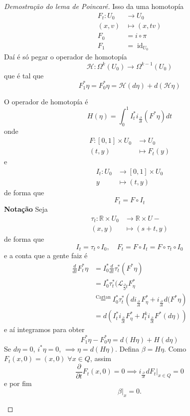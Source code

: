 \begin{itemize}
\begin{proof}[Demostra\c c\~ao do lema de Poincar\'e]
			Isso da uma homotop\'ia
			\begin{align*}
				F_t: U_0 &\longrightarrow U_0 \\
				(x,v) &\longmapsto (x,tv)\\
				F_0&=i\circ \pi\\
				F_1&=\operatorname{id}_{U_0}
			\end{align*}
			Da\'i \'e s\'o pegar o operador de homotop\'ia
			\[\mathcal{H}:\Omega^{k}(U_0)\to \Omega^{k-1}(U_0)\]
			que \'e tal que
			\[F_1^*\eta=F_0^* \eta=\mathcal{H}(d\eta)+d(\mathcal{H}\eta)\]
			\begin{claim}
				O operador de homotop\'ia \'e
				\[H(\eta)=\int_{0}^1I^*_ti_{ \frac{\partial }{\partial t}}(F^*\eta)dt\]
				onde
				\begin{align*}
					F: [0,1]\times U_0 &\longrightarrow U_0 \\
					(t,y) &\longmapsto F_t(y)
				\end{align*}
				e
				\begin{align*}
					I_t: U_0 &\longrightarrow [0,1]\times U_0 \\
					y &\longmapsto (t,y)
				\end{align*}
				de forma que
				\[F_t=F\circ I_t\]
				\textbf{Nota\c c\~ao} Seja
				\begin{align*}
					\tau_t: \mathbb{R}\times U_0 &\longrightarrow \mathbb{R}\times U- \\
					(x,y) &\longmapsto (s+t,y)
				\end{align*}
				de forma que
				\[I_t=\tau_t\circ I_0,\quad F_t=F\circ I_t=F\circ \tau_t\circ I_0\]
				e a conta que a gente faiz \'e
				\begin{align*}
					\frac{d}{dt}F_t^*\eta&=I_0^*\frac{d}{dt}\tau_t^* (F^* \eta)\\
					&=I_0^* \tau_t^* (\mathcal{L}_{\frac{\partial }{\partial }t}F^*_{\eta}\\
					&\overset{\text{Cartan}}{=}I_0^* \tau_t^*\left( di_{ \frac{\partial }{\partial t}}F^* _\eta+i_{\frac{\partial }{\partial t}}d(F^*\eta \right) \\
					&=d\left( I_{t}^* i_{\frac{\partial }{\partial t}}F^*_{\eta}+I_t^ki_{\frac{\partial }{\partial t}}F^*(d\eta) \right) 
				\end{align*}
				e a\'i integramos para obter
				\[F_1^*\eta-F^*_0\eta=d(H\eta)+H(d\eta)\]
				Se $d\eta=0$,  $i^*\eta=0$, $\implies \eta=d(H\eta)$. Defina $\beta=H\eta$. Como  $F_t(x,0)=(x,0)\;\forall x\in Q$, assim
				\[\frac{\partial }{\partial t}F_t(x,0)=0\implies i_{\frac{\partial }{\partial t}}dF_t |_{x\in Q}=0\]
				e por fim
				\[\beta|_{x}=0.\]
			\end{claim}
		\end{proof}
\end{itemize}

